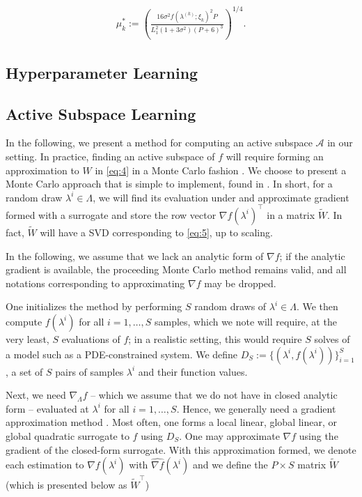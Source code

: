 \documentclass{amsart}
\newcommand{\A}{\mathcal{A}}
\begin{document}
\begin{eqnarray} \label{eq:10}
\mu^*_k:=\left( \frac{16 \sigma^2 f(\lambda^{(k)};\xi_k)^2 P}{L_1^2(1+3\sigma^2)(P+6)^3}\right)^{1/4}.
\end{eqnarray} 

\noindent 


\subsection{Hyperparameter Learning}


\subsection{Active Subspace Learning}

In the following, we present a method for computing an active subspace $\A$ in our setting. In practice, finding an active subspace of $f$ will require forming an approximation to $W$ in \eqref{eq:4} in a Monte Carlo fashion \cite{ConstantineMC}. We choose to present a Monte Carlo approach that is simple to implement, found in \cite{Russi}. In short, for a random draw $\lambda^i \in \Lambda$, we will find its evaluation under and approximate gradient formed with a surrogate and store the row vector $\nabla f(\lambda^i)^\top$ in a matrix $\tilde{W}$. In fact, $\tilde{W}$ will have a SVD corresponding to \eqref{eq:5}, up to scaling.

In the following, we assume that we lack an analytic form of $\nabla f$; if the analytic gradient is available, the proceeding Monte Carlo method remains valid, and all notations corresponding to approximating $\nabla f$ may be dropped.


One initializes the method by performing $S$ random draws of $\lambda^i \in \Lambda$. We then compute $f(\lambda^i)$ for all $i=1,\ldots,S$ samples, which we note will require, at the very least, $S$ evaluations of $f$; in a realistic setting, this would require $S$ solves of a model such as a PDE-constrained system. We define $D_S:=\{(\lambda^i,f(\lambda^i))\}_{i=1}^S$, a set of $S$ pairs of samples $\lambda^i$ and their function values. 

Next, we need $\nabla_\Lambda f$ -- which we assume that we do not have in closed analytic form -- evaluated at $\lambda^i$ for all $i=1,\ldots,S$. Hence, we generally need a gradient approximation method \cite{Constantine2015, Smith}. Most often, one forms a local linear, global linear, or global quadratic surrogate to $f$ using $D_S$. One may approximate $\nabla f$ using the gradient of the closed-form surrogate. With this approximation formed, we denote each estimation to $\nabla f(\lambda^i)$ with $\hat{\nabla f}(\lambda^i)$ and we define the $P \times S$ matrix $\tilde{W}$ (which is presented below as $\tilde{W}^\top$)
\end{document}
